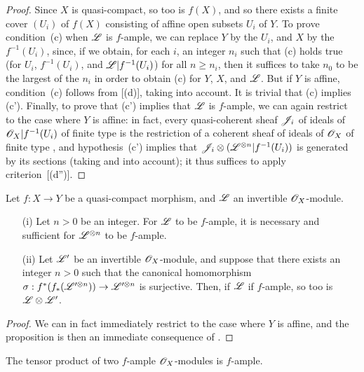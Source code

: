 \begin{proof}
Since $X$ is quasi-compact, so too is $f(X)$, and so there exists a finite cover $(U_i)$ of $f(X)$ consisting of affine open subsets $U_i$ of $Y$.
To prove condition~(c) when $\mathscr{L}$ is $f$-ample, we can replace $Y$ by the $U_i$, and $X$ by the $f^{-1}(U_i)$, since, if we obtain, for each $i$, an integer $n_i$ such that (c) holds true (for $U_i$, $f^{-1}(U_i)$, and $\mathscr{L}|f^{-1}(U_i)$) for all $n\geq n_i$, then it suffices to take $n_0$ to be the largest of the $n_i$ in order to obtain (c) for $Y$, $X$, and $\mathscr{L}$.
But if $Y$ is affine, condition~(c) follows from [(d)], taking  into account.
It is trivial that (c) implies (c').
Finally, to prove that (c') implies that $\mathscr{L}$ is $f$-ample, we can again restrict to the case where $Y$ is affine:
in fact, every quasi-coherent sheaf $\mathscr{J}_i$ of ideals of $\mathscr{O}_X|f^{-1}(U_i)$ of finite type is the restriction of a coherent sheaf of ideals of $\mathscr{O}_X$ of finite type , and hypothesis~(c') implies that
$\mathscr{J}_i\otimes(\mathscr{L}^{\otimes n}|f^{-1}(U_i))$ is generated by its sections (taking  and  into account);
it thus suffices to apply criterion~[(d'')].
\end{proof}

\begin{proposition}[4.6.9]
\label{II.4.6.9}
Let $f:X\to Y$ be a quasi-compact morphism, and $\mathscr{L}$ an invertible $\mathscr{O}_X$-module.
\begin{enumerate}
  \item[\rm{(i)}] Let $n>0$ be an integer.
    For $\mathscr{L}$ to be $f$-ample, it is necessary and sufficient for $\mathscr{L}^{\otimes n}$ to be $f$-ample.
  \item[\rm{(ii)}] Let $\mathscr{L}'$ be an invertible $\mathscr{O}_X$-module, and suppose that there exists an integer $n>0$ such that the canonical homomorphism $\sigma:f^*(f_*(\sh{L}'^{\otimes n}))\to\sh{L}'^{\otimes n}$ is surjective.
    Then, if $\mathscr{L}$ if $f$-ample, so too is $\mathscr{L}\otimes\mathscr{L}'$.
\end{enumerate}
\end{proposition}

\begin{proof}
We can in fact immediately restrict to the case where $Y$ is affine, and the proposition is then an immediate consequence of .
\end{proof}

\begin{corollary}[4.6.10]
\label{II.4.6.10}
The tensor product of two $f$-ample $\mathscr{O}_X$-modules is $f$-ample.
\end{corollary}


